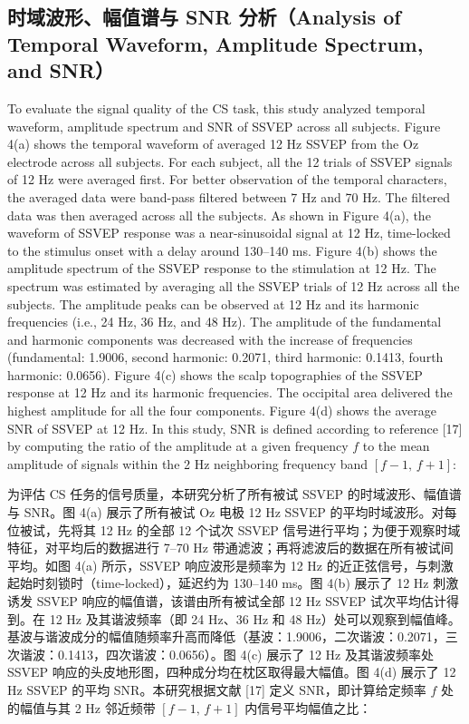 \documentclass[11pt]{ctexart}
\newenvironment{en}{\begin{enbox}\color{black!85}}{\end{enbox}}
\newenvironment{zh}{\begin{zhbox}}{\end{zhbox}}
\begin{document}
\subsection{时域波形、幅值谱与 SNR 分析（Analysis of Temporal Waveform, Amplitude Spectrum, and SNR）}
\begin{en}
To evaluate the signal quality of the CS task, this study analyzed temporal waveform, amplitude spectrum and SNR of SSVEP across all subjects. Figure 4(a) shows the temporal waveform of averaged 12 Hz SSVEP from the Oz electrode across all subjects. For each subject, all the 12 trials of SSVEP signals of 12 Hz were averaged first. For better observation of the temporal characters, the averaged data were band-pass filtered between 7 Hz and 70 Hz. The filtered data was then averaged across all the subjects. As shown in Figure 4(a), the waveform of SSVEP response was a near-sinusoidal signal at 12 Hz, time-locked to the stimulus onset with a delay around 130--140 ms. Figure 4(b) shows the amplitude spectrum of the SSVEP response to the stimulation at 12 Hz. The spectrum was estimated by averaging all the SSVEP trials of 12 Hz across all the subjects. The amplitude peaks can be observed at 12 Hz and its harmonic frequencies (i.e., 24 Hz, 36 Hz, and 48 Hz). The amplitude of the fundamental and harmonic components was decreased with the increase of frequencies (fundamental: 1.9006, second harmonic: 0.2071, third harmonic: 0.1413, fourth harmonic: 0.0656). Figure 4(c) shows the scalp topographies of the SSVEP response at 12 Hz and its harmonic frequencies. The occipital area delivered the highest amplitude for all the four components. Figure 4(d) shows the average SNR of SSVEP at 12 Hz. In this study, SNR is defined according to reference [17] by computing the ratio of the amplitude at a given frequency $f$ to the mean amplitude of signals within the 2 Hz neighboring frequency band $[f-1,\, f+1]$:
\end{en}
\begin{zh}
为评估 CS 任务的信号质量，本研究分析了所有被试 SSVEP 的时域波形、幅值谱与 SNR。图 4(a) 展示了所有被试 Oz 电极 12 Hz SSVEP 的平均时域波形。对每位被试，先将其 12 Hz 的全部 12 个试次 SSVEP 信号进行平均；为便于观察时域特征，对平均后的数据进行 7--70 Hz 带通滤波；再将滤波后的数据在所有被试间平均。如图 4(a) 所示，SSVEP 响应波形是频率为 12 Hz 的近正弦信号，与刺激起始时刻锁时（time-locked），延迟约为 130--140 ms。图 4(b) 展示了 12 Hz 刺激诱发 SSVEP 响应的幅值谱，该谱由所有被试全部 12 Hz SSVEP 试次平均估计得到。在 12 Hz 及其谐波频率（即 24 Hz、36 Hz 和 48 Hz）处可以观察到幅值峰。基波与谐波成分的幅值随频率升高而降低（基波：1.9006，二次谐波：0.2071，三次谐波：0.1413，四次谐波：0.0656）。图 4(c) 展示了 12 Hz 及其谐波频率处 SSVEP 响应的头皮地形图，四种成分均在枕区取得最大幅值。图 4(d) 展示了 12 Hz SSVEP 的平均 SNR。本研究根据文献 [17] 定义 SNR，即计算给定频率 $f$ 处的幅值与其 2 Hz 邻近频带 $[f-1,\, f+1]$ 内信号平均幅值之比：
\end{zh}
\end{document}
